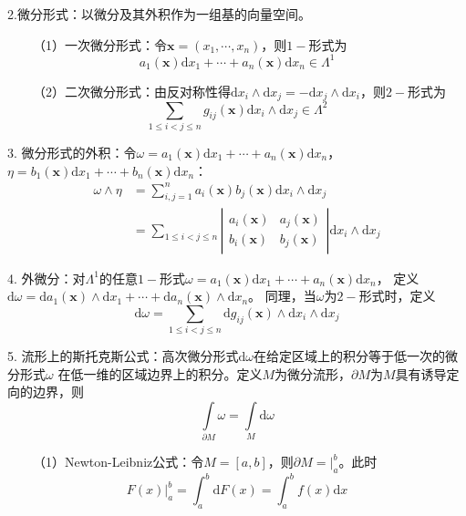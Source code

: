 2.微分形式：以微分及其外积作为一组基的向量空间。

~~~~（1）一次微分形式：令$\mathbf{x}=(x_1,\cdots,x_n)$，则$1-$形式为
\begin{equation*}
    a_1(\mathbf{x})\mathrm{d}x_1 +\cdots +a_n(\mathbf{x})\mathrm{d}x_n \in \Lambda^1
\end{equation*}

~~~~（2）二次微分形式：由反对称性得$\mathrm{d}x_i \wedge \mathrm{d}x_j =-\mathrm{d}x_j \wedge \mathrm{d}x_i$，则$2-$形式为
\begin{equation*}
    \sum\limits_{1\leqslant i<j \leqslant n} g_{ij}(\mathbf{x}) \mathrm{d}x_i \wedge \mathrm{d}x_j \in \Lambda^2
\end{equation*}

3. 微分形式的外积：令$\omega = a_1(\mathbf{x})\mathrm{d}x_1+\cdots + a_n(\mathbf{x})\mathrm{d}x_n$，$\eta = b_1(\mathbf{x})\mathrm{d}x_1+\cdots + b_n(\mathbf{x})\mathrm{d}x_n$：
\begin{align*}
    \omega \wedge \eta &=\sum\limits_{i,j=1}^n a_i(\mathbf{x})b_j(\mathbf{x})\mathrm{d}x_i \wedge \mathrm{d}x_j\\
    &=\sum\limits_{1\leqslant i<j \leqslant n}\left|\begin{matrix}
        a_i(\mathbf{x}) & a_j(\mathbf{x})\\
        b_i(\mathbf{x}) & b_j(\mathbf{x})
    \end{matrix}\right| \mathrm{d}x_i \wedge \mathrm{d}x_j
\end{align*}

4. 外微分：对$\Lambda^1$的任意$1-$形式$\omega = a_1(\mathbf{x})\mathrm{d}x_1+\cdots+a_n(\mathbf{x})\mathrm{d}x_n$，
定义$\mathrm{d} \omega = \mathrm{d}a_1(\mathbf{x})\wedge \mathrm{d}x_1+\cdots+\mathrm{d}a_n(\mathbf{x})\wedge \mathrm{d}x_n$。
同理，当$\omega$为$2-$形式时，定义
\begin{equation*}
    \mathrm{d}\omega = \sum\limits_{1\leqslant i<j \leqslant n} \mathrm{d}g_{ij}(\mathbf{x})\wedge  \mathrm{d}x_i \wedge \mathrm{d}x_j
\end{equation*}

5. 流形上的斯托克斯公式：高次微分形式$\mathrm{d}\omega$在给定区域上的积分等于低一次的微分形式$\omega$ 在低一维的区域边界上的积分。定义$M$为微分流形，$\partial M$为$M$具有诱导定向的边界，则
\begin{equation*}
    \int \limits_{\partial M}\omega = \int\limits_{M}\mathrm{d}\omega
\end{equation*}

~~~~（1）Newton-Leibniz公式：令$M=[a,b]$，则$\partial M=\big|_a^b$。此时
\begin{equation*}
    F(x)\big|_a^b =\int_a^b \mathrm{d}F(x)=\int_a^b f(x)\mathrm{d}x
\end{equation*}

